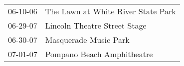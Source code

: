 \begin{supertabular}{p{0.07\textwidth}p{0.23\textwidth}}
 06-10-06 &  The Lawn at White River State Park \\
 06-29-07 &        Lincoln Theatre Street Stage \\
 06-30-07 &               Masquerade Music Park \\
 07-01-07 &          Pompano Beach Amphitheatre \\
\end{supertabular}
